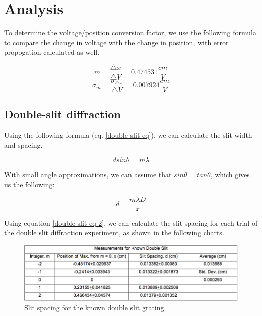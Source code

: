 \documentclass{article}
\begin{document}
\section{Analysis}

To determine the voltage/position conversion factor, we use the following
formula to compare the change in voltage with the change in position, with error
propogation calculated as well.

\begin{equation}
    \label{vp-conversion-1}
    m = \frac{\bigtriangleup x}{\bigtriangleup V} = 0.474531 \frac{cm}{V}
\end{equation}
\begin{equation}
    \label{vp-conversion-2}
    \sigma_{m} = \frac{\sigma_{\bigtriangleup x}}{\bigtriangleup V} = 0.007924
    \frac{cm}{V}
\end{equation}

\subsection{Double-slit diffraction}

Using the following formula (eq. \ref{double-slit-eq}), we can calculate the
slit width and spacing.

\begin{equation}
    \label{double-slit-eq}
    d sin\theta = m\lambda
\end{equation}

With small angle approximations, we can assume that $sin\theta = tan\theta$,
which gives us the following:

\begin{equation}
    \label{double-slit-eq-2}
    d = \frac{m\lambda D}{x}
\end{equation}

Using equation \ref{double-slit-eq-2}, we can calculate the slit spacing for
each trial of the double slit diffraction experiment, as shown in the following
charts.

\begin{figure}[H]
    \centering
    \includegraphics[width=\textwidth]{charts/known-chart}
    \caption{Slit spacing for the known double slit grating}
    \label{known-chart}
\end{figure}
\end{document}
